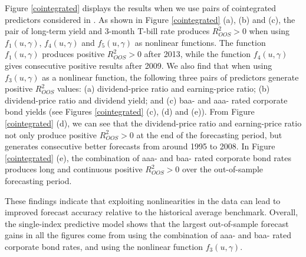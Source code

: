 \documentclass[a4paper,12pt,times,numbered,print,index]{report}
\numberwithin{equation}{section}
\begin{document}
	Figure \ref{cointegrated} displays the results when we use pairs of cointegrated predictors considered in \cite{zhou2018semiparametric}. As shown in Figure \ref{cointegrated} (a), (b) and (c), the pair of long-term yield and 3-month T-bill rate produces $ R^2_{OOS}>0 $ when using  $f_1\left( u,\gamma\right)$, $f_4\left( u,\gamma\right)$ and $f_5\left( u,\gamma\right)$ as nonlinear functions. The function $f_1\left( u,\gamma\right)$ produces positive $ R^2_{OOS}>0 $ after 2013, while the function  $f_4\left( u,\gamma\right)$ gives consecutive positive results after 2009. We also find that when using $f_3\left( u,\gamma\right)$ as a nonlinear function, the following three pairs of predictors generate positive $R_{OOS}^{2}$ values: (a) dividend-price ratio and earning-price ratio; (b) dividend-price ratio and dividend yield; and (c) baa- and aaa- rated corporate bond yields (see Figures \ref{cointegrated} (c), (d) and (e)). From Figure \ref{cointegrated} (d), we can see that the dividend-price ratio and earning-price ratio not only produce positive $ R^2_{OOS}>0 $ at the end of the forecasting period, but generates consecutive better forecasts from around 1995 to 2008. In Figure \ref{cointegrated} (e), the combination of aaa- and baa- rated corporate bond rates produces long and continuous positive $ R^2_{OOS}>0 $ over the out-of-sample forecasting period.
	
	
	These findings indicate that exploiting nonlinearities in the data can lead to improved forecast accuracy relative to the historical average benchmark. Overall, the single-index predictive model shows that the largest out-of-sample forecast gains in all the figures come from using the combination of aaa- and baa- rated corporate bond rates, and using the nonlinear function $f_3\left( u,\gamma\right)$. \\
	
\end{document}

